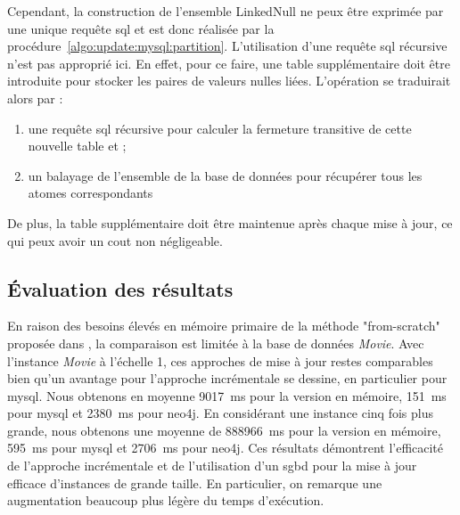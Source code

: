 Cependant, la construction de l'ensemble \textsf{LinkedNull} ne peux être exprimée par une unique requête \gls{sql} et est donc réalisée par la procédure~\ref{algo:update:mysql:partition}.
L'utilisation d'une requête \gls{sql} récursive n'est pas approprié ici.
En effet, pour ce faire, une table supplémentaire doit être introduite pour stocker les paires de valeurs nulles liées.
L'opération se traduirait alors par :
\begin{enumerate}
    \item une requête \gls{sql} récursive pour calculer la fermeture transitive de cette nouvelle table et ;
    \item un balayage de l'ensemble de la base de données pour récupérer tous les atomes correspondants
\end{enumerate}
De plus, la table supplémentaire doit être maintenue après chaque mise à jour, ce qui peux avoir un cout non négligeable.

\subsection{Évaluation des résultats}
En raison des besoins élevés en mémoire primaire de la méthode "from-scratch" proposée dans \cite{chabinConsistentUpdatingDatabases2020}, la comparaison est limitée à la base de données \textit{Movie}.
Avec l'instance \textit{Movie} à l'échelle 1, ces approches de mise à jour restes comparables bien qu'un avantage pour l'approche incrémentale se dessine, en particulier pour \gls{mysql}.
Nous obtenons en moyenne \SI{9017}{\ms} pour la version en mémoire, \SI{151}{\ms} pour \gls{mysql} et \SI{2380}{\ms} pour \gls{neo4j}.
En considérant une instance cinq fois plus grande, nous obtenons une moyenne de \SI{888966}{\ms} pour la version en mémoire, \SI{595}{\ms} pour \gls{mysql} et \SI{2706}{\ms} pour \gls{neo4j}.
Ces résultats démontrent l'efficacité de l'approche incrémentale et de l'utilisation d'un \gls{sgbd} pour la mise à jour efficace d'instances de grande taille.
En particulier, on remarque une augmentation beaucoup plus légère du temps d'exécution.

